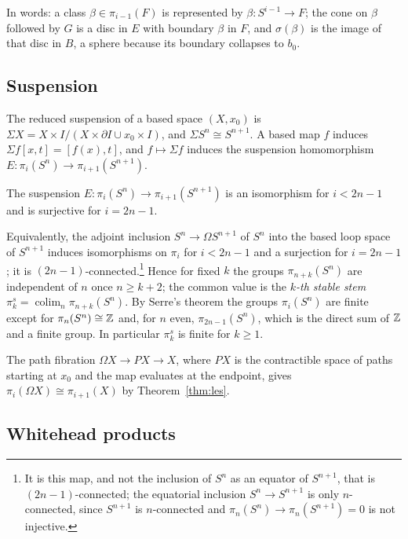 \begin{remark}
In words: a class $\beta\in\pi_{i-1}(F)$ is represented by $\beta\colon S^{i-1}\to F$; the cone on $\beta$ followed by $G$ is a disc in $E$ with boundary $\beta$ in $F$, and $\sigma(\beta)$ is the image of that disc in $B$, a sphere because its boundary collapses to $b_0$.
\end{remark}

\subsection{Suspension}

The reduced suspension of a based space $(X,x_0)$ is $\Sigma X=X\times I/(X\times\partial I\cup x_0\times I)$, and $\Sigma S^n\cong S^{n+1}$. A based map $f$ induces $\Sigma f[x,t]=[f(x),t]$, and $f\mapsto\Sigma f$ induces the suspension homomorphism $E\colon\pi_i(S^n)\to\pi_{i+1}(S^{n+1})$.

\begin{theorem}\label{thm:freudenthal}
The suspension $E\colon\pi_i(S^n)\to\pi_{i+1}(S^{n+1})$ is an isomorphism for $i<2n-1$ and is surjective for $i=2n-1$.
\end{theorem}

Equivalently, the adjoint inclusion $S^n\to\Omega S^{n+1}$ of $S^n$ into the based loop space of $S^{n+1}$ induces isomorphisms on $\pi_i$ for $i<2n-1$ and a surjection for $i=2n-1$; it is $(2n-1)$-connected.\footnote{It is this map, and not the inclusion of $S^n$ as an equator of $S^{n+1}$, that is $(2n-1)$-connected; the equatorial inclusion $S^n\to S^{n+1}$ is only $n$-connected, since $S^{n+1}$ is $n$-connected and $\pi_{n}(S^n)\to\pi_n(S^{n+1})=0$ is not injective.} Hence for fixed $k$ the groups $\pi_{n+k}(S^n)$ are independent of $n$ once $n\ge k+2$; the common value is the \emph{$k$-th stable stem} $\pi_k^s=\operatorname{colim}_n\pi_{n+k}(S^n)$. By Serre's theorem \cite{Ser53} the groups $\pi_i(S^n)$ are finite except for $\pi_n(S^n)\cong\mathbb{Z}$ and, for $n$ even, $\pi_{2n-1}(S^n)$, which is the direct sum of $\mathbb{Z}$ and a finite group. In particular $\pi_k^s$ is finite for $k\ge1$.

The path fibration $\Omega X\to PX\to X$, where $PX$ is the contractible space of paths starting at $x_0$ and the map evaluates at the endpoint, gives $\pi_i(\Omega X)\cong\pi_{i+1}(X)$ by Theorem~\ref{thm:les}.

\subsection{Whitehead products}

